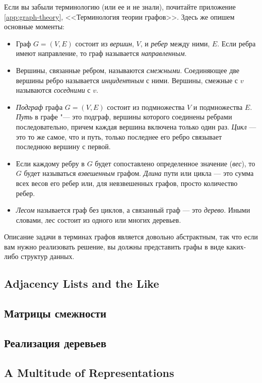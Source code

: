Если вы забыли терминологию (или ее и не знали), почитайте приложение \ref{app:graph-theory}, <<Терминология теории графов>>. Здесь же опишем основные моменты:

\begin{itemize}
\item Граф $G = (V, E)$ состоит из \textit{вершин}, $V$, и \textit{ребер} между ними, $E$. Если ребра имеют направление, то граф называется \textit{направленным}.
\item Вершины, связанные ребром, называются \textit{смежными}. Соединяющее две вершины ребро называется \textit{инцидентным} с ними. Вершины, смежные с $v$ называются \textit{соседними} с $v$.
\item \textit{Подграф} графа $G = (V,E)$ состоит из подмножества $V$ и подмножества $E$. \textit{Путь} в графе "--- это подграф, вершины которого соединены ребрами последовательно, причем каждая вершина включена только один раз. \textit{Цикл} — это то же самое, что и путь, только последнее его ребро связывает последнюю вершину с первой.
\item Если каждому ребру в $G$ будет сопоставлено определенное значение (\textit{вес}), то $G$ будет называться \textit{взвешенным} графом. \textit{Длина} пути или цикла — это сумма всех весов его ребер или, для невзвешенных графов, просто количество ребер.
\item \textit{Лесом} называется граф без циклов, а связанный граф — это \textit{дерево}. Иными словами, лес состоит из одного или многих деревьев.
\end{itemize}

Описание задачи в терминах графов является довольно абстрактным, так что если вам нужно реализовать решение, вы должны представить графы в виде каких-либо структур данных.

\newpage
\subsection{Adjacency Lists and the Like}
\subsection{Матрицы смежности}
\subsection{Реализация деревьев}
\subsection{A Multitude of Representations}

